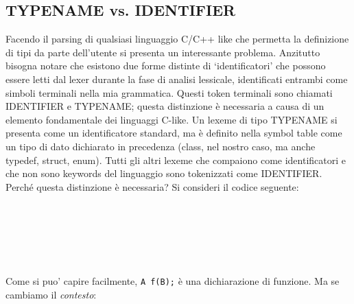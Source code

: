 \documentclass[a4paper, 11pt]{article}
\newcommand{\scitea}[1]{\noindent{\ttfamily{\textcolor[rgb]{0.0, 0.0, 0.0}{#1}}}}
\newcommand{\scitec}[1]{\noindent{\ttfamily{\textcolor[rgb]{0.0, 0.5, 0.0}{#1}}}}
\newcommand{\scitef}[1]{\noindent{\ttfamily{\textbf{\textcolor[rgb]{0.0, 0.0, 0.5}{#1}}}}}
\newcommand{\scitek}[1]{\noindent{\ttfamily{\textcolor[rgb]{0.0, 0.0, 0.0}{#1}}}}
\newcommand{\scitel}[1]{\noindent{\ttfamily{\textcolor[rgb]{0.0, 0.0, 0.0}{#1}}}}
\newcommand{\code}[1]{\scriptsize{\texttt{#1}}\normalsize}
\begin{document}
\subsection{TYPENAME vs. IDENTIFIER}

Facendo il parsing di qualsiasi linguaggio C/C++ like che permetta la definizione 
di tipi da parte dell'utente si presenta un interessante problema\cite{Ros91}. Anzitutto bisogna notare
che esistono due forme distinte di `identificatori' che possono essere letti dal lexer durante la fase di
analisi lessicale, identificati entrambi come simboli terminali nella mia grammatica.
Questi token terminali sono chiamati IDENTIFIER  e  TYPENAME; questa distinzione \`e 
necessaria a causa di un elemento fondamentale dei linguaggi C-like. 
Un lexeme di tipo TYPENAME si presenta come un identificatore standard, ma 
\`e definito nella symbol table come un tipo di dato dichiarato in precedenza 
(class, nel nostro caso, ma anche typedef, struct, enum). 
Tutti gli altri lexeme che compaiono come identificatori e che non sono keywords del
linguaggio sono tokenizzati come IDENTIFIER.
\\
Perch\'e questa distinzione \`e necessaria? Si consideri il codice seguente:
\\
\noindent
\scriptsize{
\scitef{class}
\scitea{ }
\scitel{A}
\scitek{;}
\scitea{} \\
\scitef{class}
\scitea{ }
\scitel{B}
\scitek{;}
\scitea{} \\
\scitea{} \\
\scitel{A}
\scitea{ }
\scitel{f}
\scitek{(}
\scitel{B}
\scitek{);}
\scitea{ }
\scitec{//dichiarazione di funzione f: B -$>$ A} \\
\scitea{{\hspace*{1em}}{\hspace*{1em}}{\hspace*{1em}}{\hspace*{1em}}{\hspace*{1em}}{\hspace*{1em}}{\hspace*{1em}}{\hspace*{1em}}{\hspace*{1em}} }
\scitec{//B : TYPENAME} \\
\scitea{}
} 
\normalfont
\normalsize
\\
Come si puo' capire facilmente, \code{A f(B);} \`e una dichiarazione di funzione. Ma se cambiamo il \emph{contesto}:
\\
\noindent
\end{document}
